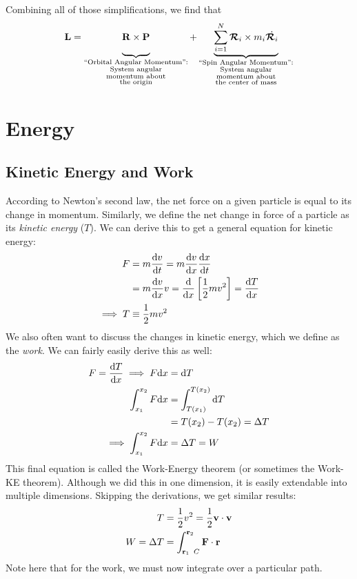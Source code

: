 \documentclass[a4paper]{article}
\begin{document}
Combining all of those simplifications, we find that
\begin{align*}
    \vec{L} = \underbrace{\vrule width0pt height0pt depth1.25em\relax
    \vec{R}\times\vec{P}}_{\substack{\text{``Orbital 
    Angular Momentum'':}\\
    \text{System angular}\\ \text{momentum about}\\\text{the origin}}}
    +
    \underbrace{\sum_{i=1}^N \vec{\mathcal{R}}_i \times 
        m_i\dot{\vec{\mathcal{R}}_i}}_{\substack{\text{``Spin Angular
        Momentum'':}\\ \text{System angular} \\ \text{momentum about} \\
        \text{the center of mass} }}
\end{align*}

\section{Energy}
\subsection{Kinetic Energy and Work}
    According to Newton's second law, the net force on a given particle is
    equal to its change in momentum. Similarly, we define the net change in
    force of a particle as its \emph{kinetic energy} ($T$). We can derive
    this to get a general equation for kinetic energy:
    \begin{align*}
        F &= m\frac{\d v}{\d t} = m\frac{\d v}{\d x}\frac{\d x}{\d t}\\
        &=m\frac{\d v}{\d x}v = \frac{\d}{\d x}\left[\frac{1}{2}mv^2\right] =
            \frac{\d T}{\d x}\\
        \implies T &\equiv \frac{1}{2}mv^2
    \end{align*}
    We also often want to discuss the changes in kinetic energy, which
    we define as the \emph{work}. We can fairly easily derive this as well:
    \begin{align*}
        F = \frac{\d T}{\d x} \implies F\d x &= \d T\\
        \int_{x_1}^{x_2} F\d x &= \int_{T(x_1)}^{T(x_2)}\d T\\
        &= T(x_2)-T(x_2) = \Delta T\\
        \implies \int_{x_1}^{x_2} F\d x &= \Delta T = W
    \end{align*}
    This final equation is called the Work-Energy theorem (or sometimes the
    Work-KE theorem). Although we did this in one dimension, it is easily
    extendable into multiple dimensions. Skipping the derivations, we get
    similar results:
    \begin{align*}
        T &= \frac{1}{2}v^2 = \frac{1}{2}\vec{v}\cdot\vec{v}\\
        W = \Delta T &= \int_{\vec{r}_1\hspace{1ex} C}^{\vec{r}_2}
            \vec{F}\cdot\vec{r}
    \end{align*}
    Note here that for the work, we must now integrate over a particular path.
\end{document}
